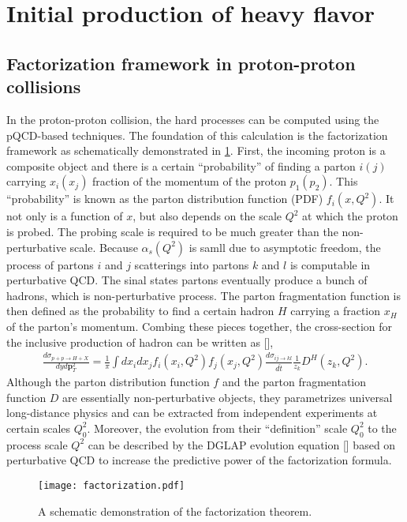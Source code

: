 \section{Initial production of heavy flavor}
\label{section:hard}
\subsection{Factorization framework in proton-proton collisions}
In the proton-proton collision, the hard processes can be computed using the pQCD-based techniques.
The foundation of this calculation is the factorization framework as schematically demonstrated in \ref{fig:factorization}.
First, the incoming proton is a composite object and there is a certain ``probability'' of finding a parton $i(j)$ carrying $x_i(x_j)$ fraction of the momentum of the proton $p_1(p_2)$.
This ``probability'' is known as the parton distribution function (PDF) $f_i(x, Q^2)$.
It not only is a function of $x$, but also depends on the scale $Q^2$ at which the proton is probed.
The probing scale is required to be much greater than the non-perturbative scale.
Because $\alpha_s(Q^2)$ is samll due to asymptotic freedom, the process of partons $i$ and $j$ scatterings into partons $k$ and $l$ is computable in perturbative QCD.
The sinal states partons eventually produce a bunch of hadrons, which is non-perturbative process.
The parton fragmentation function is then defined as the probability to find a certain hadron $H$ carrying a fraction $x_H$ of the parton's momentum.
Combing these pieces together, the cross-section for the inclusive production of hadron can be written as [],
\begin{eqnarray}
\frac{d\sigma_{p+p\rightarrow H+X}}{dy d\mathbf{p}_T^2} = \frac{1}{\pi}\int dx_i dx_j f_i(x_i, Q^2) f_j(x_j, Q^2) \frac{d\sigma_{ij\rightarrow kl}}{d\hat{t}} \frac{1}{z_k}D^H(z_k, Q^2).
\end{eqnarray}
Although the parton distribution function $f$ and the parton fragmentation function $D$ are essentially non-perturbative objects, they parametrizes universal long-distance physics and can be extracted from independent experiments at certain scales $Q_0^2$.
Moreover, the evolution from their ``definition'' scale $Q_0^2$ to the process scale $Q^2$ can be described by the DGLAP evolution equation [] based on perturbative QCD to increase the predictive power of the factorization formula.

\begin{figure}
\centering
\texttt{[image: factorization.pdf]}
\caption{A schematic demonstration of the factorization theorem.}
\label{fig:factorization}
\end{figure}

